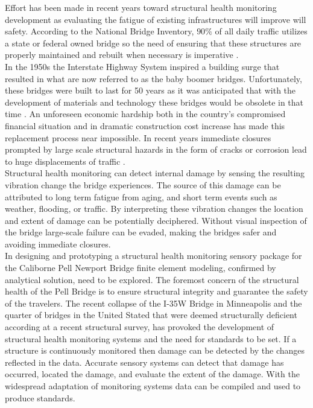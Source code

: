\indent Effort has been made in recent years toward structural
health monitoring development as evaluating the fatigue of existing
infrastructures will improve will safety. According to the
National Bridge Inventory, $90\%$ of all daily traffic utilizes a
state or federal owned bridge so the need of ensuring that these
structures are properly maintained and rebuilt when necessary
is imperative \cite{RobertS.Kirk:2007}. \\


\indent In the 1950s the Interstate Highway System inspired a
building surge that resulted in what are now referred to as the
baby boomer bridges. Unfortunately, these bridges were built to
last for 50 years as it was anticipated that with the development
of materials and technology these bridges would be obsolete in
that time
\cite{AmericanAssociationofStateHighwayandTransportationOffici
als:2008}. An unforeseen economic hardship both in the
country’s compromised financial situation and in dramatic
construction cost increase has made this replacement process
near impossible. In recent years immediate closures
prompted by large scale structural hazards in the form of
cracks or corrosion lead to huge displacements of traffic
\cite{AmericanAssociationofStateHighwayandTransportation
Officials:2008}. \\

\indent Structural health monitoring can detect internal damage by
sensing the resulting vibration change the bridge experiences. The
source of this damage can be attributed to long term fatigue from
aging, and short term events such as weather, flooding, or
traffic. By interpreting these vibration changes the location
and extent of damage can be potentially deciphered. Without
visual inspection of the bridge large-scale failure can be
evaded, making the bridges safer and avoiding immediate
closures. \\


\indent In designing and prototyping a structural health monitoring
sensory package for the Caliborne Pell Newport Bridge finite
element modeling, confirmed by analytical solution, need to be
explored. The foremost concern of the structural health of the
Pell Bridge is to ensure structural integrity and guarantee the
safety of the travelers. The recent collapse of the I-35W
Bridge in Minneapolis and the quarter of bridges in the United
Stated that were deemed structurally deficient according at a
recent structural survey, has provoked the development of
structural health monitoring systems and the need for
standards to be set. If a structure is continuously
monitored then damage can be detected by the changes
reflected in the data. Accurate sensory systems can
detect that damage has occurred, located the damage,
and evaluate the extent of the damage. With the
widespread adaptation of monitoring systems data can
be compiled and used to produce standards. 


